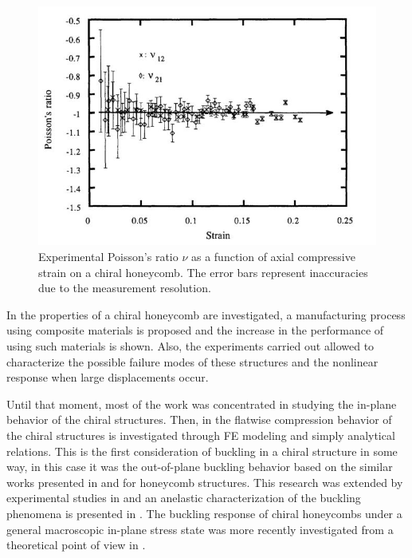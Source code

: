   \begin{figure}[!htpb]
    \centering
    \includegraphics[width=0.8 \textwidth]{figures/state-of-the-art/experimentalPoisson}
    \caption[Experimental Poisson's ratio $v$ as a function of axial compressive strain on a chiral honeycomb]{Experimental Poisson's ratio $\nu$ as a function of axial compressive strain on a chiral honeycomb. The error bars represent inaccuracies due to the measurement resolution. \cite{Prall1997}}\label{fig:experimentalPoisson}
  \end{figure}

  In \cite{Bettini2010} the properties of a chiral honeycomb are investigated, a manufacturing process using composite materials is proposed and the increase in the performance of using such materials is shown. Also, the experiments carried out allowed to characterize the possible failure modes of these structures and the nonlinear response when large displacements occur.

  Until that moment, most of the work was concentrated in studying the in-plane behavior of the chiral structures. Then, in \cite{Spadoni2005} the flatwise compression behavior of the chiral structures is investigated through FE modeling and simply analytical relations. This is the first consideration of buckling in a chiral structure in some way, in this case it was the out-of-plane buckling behavior based on the similar works presented in \cite{Zhang1992} and \cite{Gibson1999} for honeycomb structures. This research was extended by experimental studies in \cite{Scarpa2007} and an anelastic characterization of the buckling phenomena is presented in \cite{Miller2010}. The buckling response of chiral honeycombs under a general macroscopic in-plane stress state was more recently investigated from a theoretical point of view in \cite{Haghpanah2014}. 

